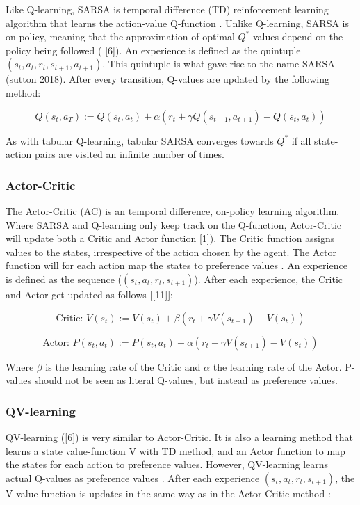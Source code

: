 \documentclass[letterpaper]{article}
\begin{document}
Like Q-learning, SARSA is temporal difference (TD) reinforcement
learning algorithm that learns the action-value Q-function \cite{wiering2007}. Unlike Q-learning, SARSA is on-policy, meaning that the
approximation of optimal \(Q^*\) values depend on the policy being
followed (\cite{wiering2008} {[}6{]}). An experience is defined as the
quintuple \((s_t, a_t, r_t, s_{t+1}, a_{t+1})\). This quintuple is what
gave rise to the name SARSA (sutton 2018). After every transition,
Q-values are updated by the following method:

\[Q(s_t,a_T) := Q(s_t,a_t) + \alpha ( r_t + \gamma Q(s_{t+1}, a_{t+1}) - Q(s_t,a_t) )\]

As with tabular Q-learning, tabular SARSA converges towards \(Q^*\) if
all state-action pairs are visited an infinite number of times.

\subsubsection{Actor-Critic}\label{actor-critic}

The Actor-Critic (AC) is an temporal difference, on-policy learning
algorithm. Where SARSA and Q-learning only keep track on the Q-function,
Actor-Critic will update both a Critic and Actor function \cite{wiering2008}
{[}1{]}). The Critic function assigns values to the states, irrespective
of the action chosen by the agent. The Actor function will for each
action map the states to preference values \cite{wiering2008}. An experience
is defined as the sequence (\((s_t, a_t, r_t, s_{t+1})\)). After each
experience, the Critic and Actor get updated as follows {[}\cite{wiering2008}{[}11{]}{]}:

$$ \textrm{Critic: } V(s_t) := V(s_t) + \beta ( r_t + \gamma V(s_{t+1}) - V(s_t) ) $$

$$ \textrm{Actor: } P(s_t, a_t) := P(s_t, a_t) + \alpha ( r_t + \gamma V(s_{t+1}) - V(s_t) ) $$

Where \(\beta\) is the learning rate of the Critic and \(\alpha\) the
learning rate of the Actor. P-values should not be seen as literal
Q-values, but instead as preference values.

\subsubsection{QV-learning}\label{qv-learning}

QV-learning (\cite{wiering2008}{[}6{]}) is very similar to Actor-Critic. It is
also a learning method that learns a state value-function V with TD
method, and an Actor function to map the states for each action to
preference values. However, QV-learning learns actual Q-values as
preference values \cite{wiering2008}. After each experience
\((s_t, a_t, r_t, s_{t+1})\), the V value-function is updates in the
same way as in the Actor-Critic method \cite{wiering2007}:
\end{document}
